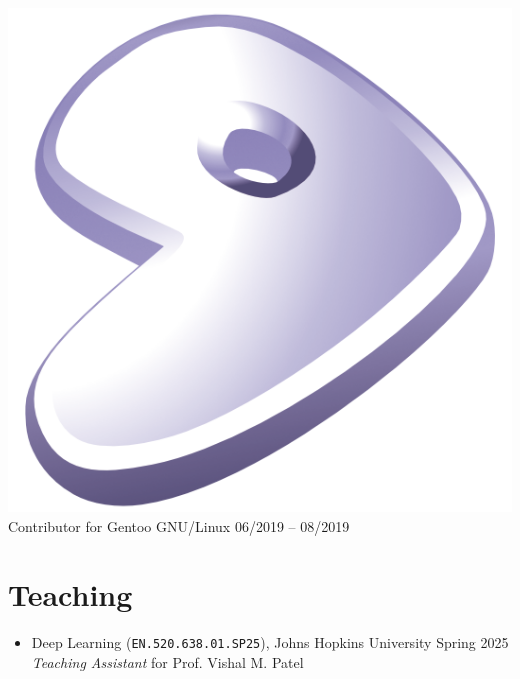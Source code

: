 \documentclass[10pt,margin,line,pifont,palatino,courier]{res}
\begin{document}
\begin{resume}
\begin{itemize}[leftmargin=*]
\begin{itemize}[noitemsep, leftmargin=*]
{            \includegraphics[height=1.2\fontcharht\font`\B]{gentoo-signet.png}
            Contributor} for Gentoo GNU/Linux
            \hfill 06/2019 -- 08/2019
    \end{itemize}
\end{itemize}

\section{\sc Teaching}

\begin{itemize}[leftmargin=*]
    \item Deep Learning (\verb|EN.520.638.01.SP25|), Johns Hopkins University \hfill Spring 2025\\
        \textit{Teaching Assistant} for Prof. Vishal M. Patel
\end{itemize}

%
%
%


\end{resume}
\end{document}

